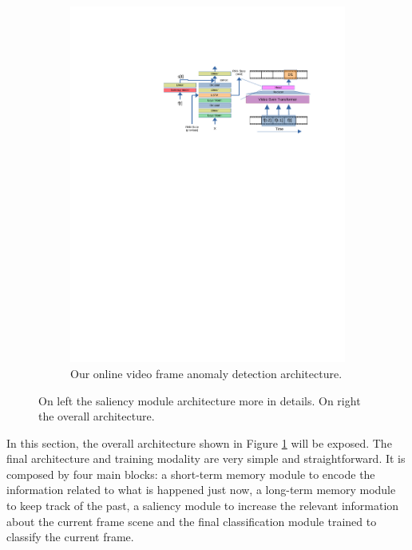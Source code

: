 \begin{figure}[!ht]
\begin{subfigure}{0.7\linewidth}
            \includegraphics[trim=205 500 80 130, clip, width=1.\linewidth]{images/arch.pdf}
        \caption{Our online video frame anomaly detection architecture.}
		\label{fig:arch}
	\end{subfigure}
	\caption{On left the saliency module architecture more in details. On right the overall architecture.}
	\label{fig:our-arch}
\end{figure}

In this section, the overall architecture shown in Figure \ref{fig:arch} will be exposed.
The final architecture and training modality are very simple and straightforward.
It is composed by four main blocks: a short-term memory module to encode the information related to what is happened just now, a long-term memory module to keep track of the past, a saliency module to increase the relevant information about the current frame scene and the final classification module trained to classify the current frame.

